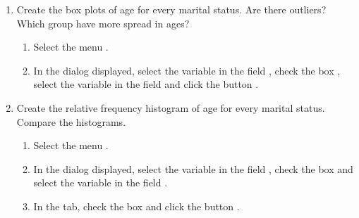 \begin{enumerate}[leftmargin=*]
\begin{enumerate}
\item Create the box plots of age for every marital status. Are there outliers? Which group have more spread in ages?
\begin{indication}
\begin{enumerate}
\item Select the menu .
\item In the dialog displayed, select the variable  in the field ,
check the box , select the variable  in the field
 and click the button .
\end{enumerate}
\end{indication}

\item Create the relative frequency histogram of age for every marital status. Compare the histograms.
\begin{indication}
\begin{enumerate}
\item Select the menu .
\item In the dialog displayed, select the variable  in the field , check the box
 and select the variable  in the field .
\item In the  tab, check the box  and click the button .
\end{enumerate}
\end{indication}
\end{enumerate}

\end{enumerate}


